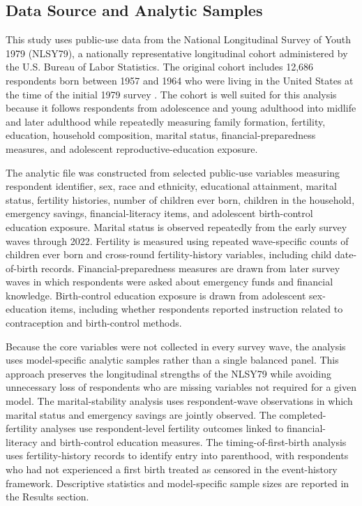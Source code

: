 \documentclass[12pt]{article}
\begin{document}
\subsection{Data Source and Analytic Samples}

This study uses public-use data from the National Longitudinal Survey of Youth 1979 (NLSY79), a nationally representative longitudinal cohort administered by the U.S. Bureau of Labor Statistics. The original cohort includes 12,686 respondents born between 1957 and 1964 who were living in the United States at the time of the initial 1979 survey \citep{bls2025nlsy79,nlsinfo2026nlsy79}. The cohort is well suited for this analysis because it follows respondents from adolescence and young adulthood into midlife and later adulthood while repeatedly measuring family formation, fertility, education, household composition, marital status, financial-preparedness measures, and adolescent reproductive-education exposure.

The analytic file was constructed from selected public-use variables measuring respondent identifier, sex, race and ethnicity, educational attainment, marital status, fertility histories, number of children ever born, children in the household, emergency savings, financial-literacy items, and adolescent birth-control education exposure. Marital status is observed repeatedly from the early survey waves through 2022. Fertility is measured using repeated wave-specific counts of children ever born and cross-round fertility-history variables, including child date-of-birth records. Financial-preparedness measures are drawn from later survey waves in which respondents were asked about emergency funds and financial knowledge. Birth-control education exposure is drawn from adolescent sex-education items, including whether respondents reported instruction related to contraception and birth-control methods.

Because the core variables were not collected in every survey wave, the analysis uses model-specific analytic samples rather than a single balanced panel. This approach preserves the longitudinal strengths of the NLSY79 while avoiding unnecessary loss of respondents who are missing variables not required for a given model. The marital-stability analysis uses respondent-wave observations in which marital status and emergency savings are jointly observed. The completed-fertility analyses use respondent-level fertility outcomes linked to financial-literacy and birth-control education measures. The timing-of-first-birth analysis uses fertility-history records to identify entry into parenthood, with respondents who had not experienced a first birth treated as censored in the event-history framework. Descriptive statistics and model-specific sample sizes are reported in the Results section.
\end{document}
